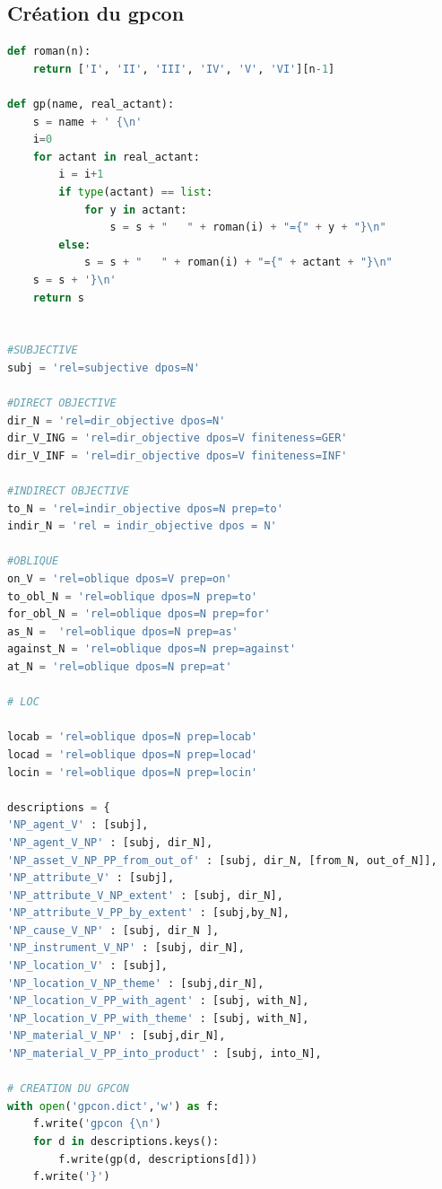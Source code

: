 \subsection{Création du gpcon}

\begin{lstlisting}[language=Python, caption = code pour gpcon.dict]
def roman(n):
    return ['I', 'II', 'III', 'IV', 'V', 'VI'][n-1]
		
def gp(name, real_actant):
    s = name + ' {\n'
    i=0
    for actant in real_actant:
        i = i+1
        if type(actant) == list:
            for y in actant:
                s = s + "   " + roman(i) + "={" + y + "}\n"
        else:
            s = s + "   " + roman(i) + "={" + actant + "}\n"
    s = s + '}\n'
    return s


#SUBJECTIVE
subj = 'rel=subjective dpos=N'

#DIRECT OBJECTIVE
dir_N = 'rel=dir_objective dpos=N'
dir_V_ING = 'rel=dir_objective dpos=V finiteness=GER'
dir_V_INF = 'rel=dir_objective dpos=V finiteness=INF'

#INDIRECT OBJECTIVE
to_N = 'rel=indir_objective dpos=N prep=to'
indir_N = 'rel = indir_objective dpos = N'

#OBLIQUE
on_V = 'rel=oblique dpos=V prep=on'
to_obl_N = 'rel=oblique dpos=N prep=to' 
for_obl_N = 'rel=oblique dpos=N prep=for'
as_N =  'rel=oblique dpos=N prep=as'
against_N = 'rel=oblique dpos=N prep=against'
at_N = 'rel=oblique dpos=N prep=at'

# LOC

locab = 'rel=oblique dpos=N prep=locab'
locad = 'rel=oblique dpos=N prep=locad'
locin = 'rel=oblique dpos=N prep=locin'

descriptions = {
'NP_agent_V' : [subj],
'NP_agent_V_NP' : [subj, dir_N],
'NP_asset_V_NP_PP_from_out_of' : [subj, dir_N, [from_N, out_of_N]],
'NP_attribute_V' : [subj],
'NP_attribute_V_NP_extent' : [subj, dir_N],
'NP_attribute_V_PP_by_extent' : [subj,by_N],
'NP_cause_V_NP' : [subj, dir_N ],
'NP_instrument_V_NP' : [subj, dir_N],
'NP_location_V' : [subj],
'NP_location_V_NP_theme' : [subj,dir_N],
'NP_location_V_PP_with_agent' : [subj, with_N],
'NP_location_V_PP_with_theme' : [subj, with_N],
'NP_material_V_NP' : [subj,dir_N],
'NP_material_V_PP_into_product' : [subj, into_N],

# CREATION DU GPCON
with open('gpcon.dict','w') as f:
    f.write('gpcon {\n')
    for d in descriptions.keys():
        f.write(gp(d, descriptions[d]))
    f.write('}')

\end{lstlisting}

